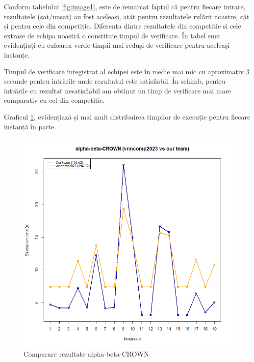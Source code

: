 Conform tabelului \ref{fig:image1}, este de remarcat faptul că pentru fiecare intrare, rezultatele (sat/unsat) au fost aceleași, atât pentru rezultatele rulării noastre, cât și pentru cele din competiție. Diferența dintre rezultatele din competitie si cele extrase de echipa noastră o constituie timpul de verificare.
În tabel sunt evidențiați cu culoarea verde timpii mai reduși de verificare pentru aceleași instanțe.

Timpul de verificare înregistrat al echipei este în medie mai mic cu aproximativ 3 secunde pentru intrările unde rezultatul este satisfiabil. În schimb, pentru intrările cu rezultat nesatisfiabil am obtinut un timp de verificare mai mare comparativ cu cel din competitie.

Graficul \ref{fig:image3}, evidențiază și mai mult distribuirea timpilor de execuție pentru fiecare instanță în parte.

\begin{figure}[h]
\centering 
\includegraphics[width=0.8\linewidth]{imagini/interpretare rezultate/abC_us_vs_vnncomp.png}
\caption{Comparare rezultate alpha-beta-CROWN}
\label{fig:image3} 
\end{figure}
\